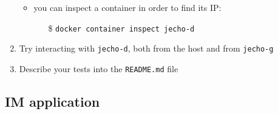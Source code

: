 \documentclass[handout]{beamer}\mode<presentation>{\usetheme{AMSCesenaBleu}}
\begin{document}
\begin{frame}[allowframebreaks]
\begin{enumerate}
\begin{itemize}
            \item you can \alert{inspect} a container in order to find its IP:
            \begin{itemize}
                \item[\$] \texttt{docker container \alert{inspect} jecho-d} 
            \end{itemize}
            
        \end{itemize}
        
        \vspace{.5cm}
        
        \item Try interacting with \texttt{jecho-d}, both from the host and from \texttt{jecho-g}
        
        \vspace{.5cm}
        
        \item Describe your tests into the \texttt{README.md} file
    \end{enumerate}
    
    
\end{frame}

\subsection{IM application}
\end{document}

